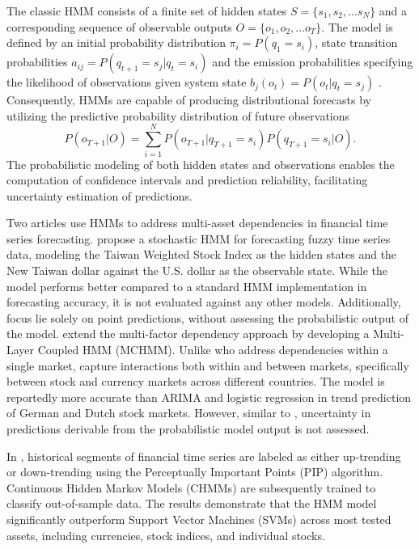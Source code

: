 The classic HMM consists of a finite set of hidden states $S = \{s_1, s_2, ... s_N\}$ and a corresponding sequence of observable outputs $O = \{o_1, o_2, ... o_T\}$. The model is defined by an initial probability distribution $\pi_i = P(q_1 = s_i)$, state transition probabilities $a_{ij} = P(q_{t+1} = s_j|q_t = s_i)$ and the emission probabilities specifying the likelihood of observations given system state $b_j(o_t) = P(o_t|q_t=s_j)$ \parencite{Rabiner1989hmm}. Consequently, HMMs are capable of producing distributional forecasts by utilizing the predictive probability distribution of future observations
\begin{equation}
        P(o_{T+1}|O) = \sum_{i=1}^{N}P(o_{T+1}|q_{T+1} = s_i)P(q_{T+1} = s_i | O).
\end{equation}
The probabilistic modeling of both hidden states and observations enables the computation of confidence intervals and prediction reliability, facilitating uncertainty estimation of predictions.

Two articles use HMMs to address multi-asset dependencies in financial time series forecasting. \textcite{li2010stochastic} propose a stochastic HMM for forecasting fuzzy time series data, modeling the Taiwan Weighted Stock Index as the hidden states and the New Taiwan dollar against the U.S. dollar as the observable state. While the model performs better compared to a standard HMM implementation in forecasting accuracy, it is not evaluated against any other models. Additionally, focus lie solely on point predictions, without assessing the probabilistic output of the model. \textcite{cao2019multi} extend the multi-factor dependency approach by developing a Multi-Layer Coupled HMM (MCHMM). Unlike \textcite{li2010stochastic} who address dependencies within a single market, \textcite{cao2019multi} capture interactions both within and between markets, specifically between stock and currency markets across different countries. The model is reportedly more accurate than ARIMA and logistic regression in trend prediction of German and Dutch stock markets. However, similar to \textcite{li2010stochastic}, uncertainty in predictions derivable from the probabilistic model output is not assessed.

In \textcite{park2011trend}, historical segments of financial time series are labeled as either up-trending or down-trending using the Perceptually Important Points (PIP) algorithm. Continuous Hidden Markov Models (CHMMs) are subsequently trained to classify out-of-sample data. The results demonstrate that the HMM model significantly outperform Support Vector Machines (SVMs) across most tested assets, including currencies, stock indices, and individual stocks.

